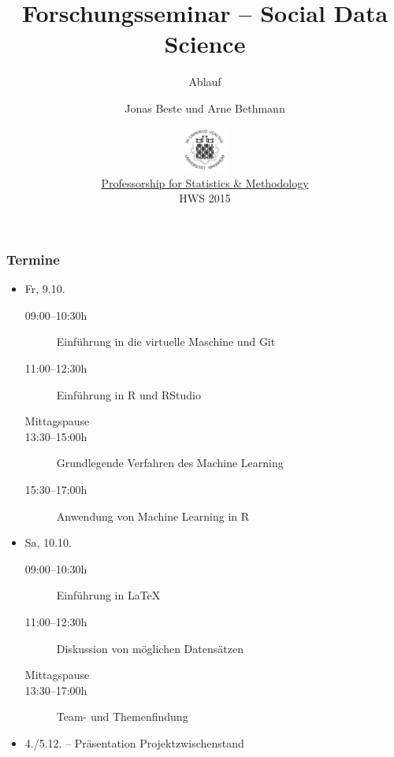 \documentclass{beamer}
\title{Forschungsseminar -- Social Data Science}
\subtitle{Ablauf}
\author[Beste \& Bethmann]{Jonas Beste und Arne Bethmann}
\date{\includegraphics[height=1.5cm]{../../img/150px-Uni_Mannheim_Siegel.png} \\
  \href{http://sswml.uni-mannheim.de/}{Professorship for Statistics \& Methodology} \\
  HWS 2015}
\begin{document}
\begin{frame}
  \titlepage
\end{frame}


\begin{frame}
  \frametitle{Termine}
  \begin{itemize}
  \item Fr, 9.10.
    \begin{description}
    \item[09:00--10:30h] Einführung in die virtuelle Maschine und Git
    \item[11:00--12:30h] Einführung in R und RStudio
    \item[Mittagspause]
    \item[13:30--15:00h] Grundlegende Verfahren des Machine Learning
    \item[15:30--17:00h] Anwendung von Machine Learning in R
    \end{description}
  \item Sa, 10.10.
    \begin{description}
    \item[09:00--10:30h] Einführung in \LaTeX
    \item[11:00--12:30h] Diskussion von möglichen Datensätzen
    \item[Mittagspause]
    \item[13:30--17:00h] Team- und Themenfindung
    \end{description}
  \item 4./5.12. -- Präsentation Projektzwischenstand
  \end{itemize}
\end{frame}
\end{document}
